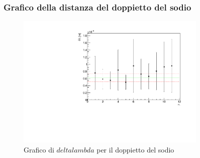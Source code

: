 \subsubsection{Grafico della distanza del doppietto del sodio}
\begin{figure}[H]
    \centering
    \includegraphics[width=0.81\textwidth]{graphsodio.pdf}
    \caption{Grafico di $delta$$lambda$ per il doppietto del sodio}
\end{figure}